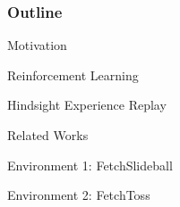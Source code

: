 \PraesentationMasterKopfzeileDreizeiler

\PraesentationTitelseite







\begin{frame}
	\frametitle{Outline}
	
	\vspace{1cm}
	\begin{PraesentationAufzaehlung}
		\item Motivation
		\item Reinforcement Learning
		\item Hindsight Experience Replay
		\item Related Works
		\item Environment 1: FetchSlideball
		\item Environment 2: FetchToss
	\end{PraesentationAufzaehlung}
	
\end{frame}
\clearpage






